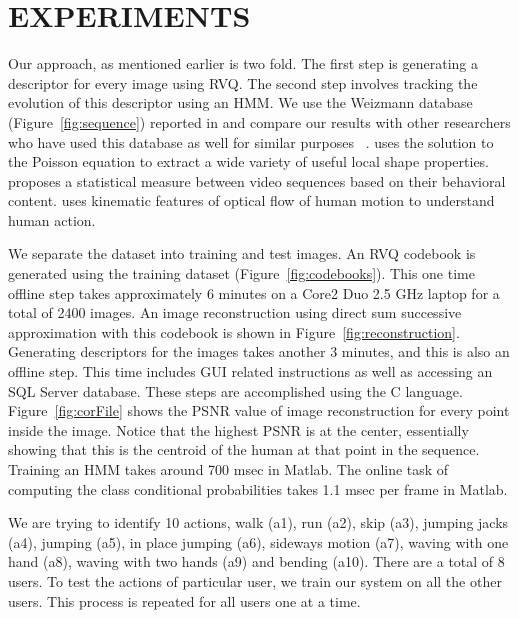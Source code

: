 \documentclass{article}
\begin{document}
\section{EXPERIMENTS}
Our approach, as mentioned earlier is two fold.  The first step is generating a descriptor for every image using RVQ.  The second step involves tracking the evolution of this descriptor using an HMM.  We use the Weizmann database (Figure~\ref{fig:sequence}) reported in \cite{2007_JNL_SpaceTimeShapes_Gorelick} and compare our results with other researchers who have used this database as well for similar purposes~\cite{2007_JNL_SpaceTimeShapes_Gorelick} \cite{2001_CNF_EventBasedAnalysisVideo_Manor} 
\cite{2010_JNL_ActionReconKinematic_Ali}.  \cite{2007_JNL_SpaceTimeShapes_Gorelick} uses the solution to the Poisson equation to extract a wide variety of useful local shape properties.  \cite{2001_CNF_EventBasedAnalysisVideo_Manor} proposes a statistical measure between video sequences based on their behavioral content.  \cite{2010_JNL_ActionReconKinematic_Ali} uses kinematic features of optical flow of human motion to understand human action.   

We separate the dataset into training and test images.  An RVQ codebook is generated using the training dataset (Figure~\ref{fig:codebooks}).  This one time offline step takes approximately 6 minutes on a Core2 Duo 2.5 GHz laptop for a total of 2400 images.  An image reconstruction using direct sum successive approximation with this codebook is shown in Figure~\ref{fig:reconstruction}.  Generating descriptors for the images takes another 3 minutes, and this is also an offline step.  This time includes GUI related instructions as well as accessing an SQL Server database.  These steps are accomplished using the C language.  Figure~\ref{fig:corFile} shows the PSNR value of image reconstruction for every point inside the image.  Notice that the highest PSNR is at the center, essentially showing that this is the centroid of the human at that point in the sequence.  Training an HMM takes around 700 msec in Matlab.  The online task of computing the class conditional probabilities takes 1.1 msec per frame in Matlab.   

We are trying to identify 10 actions, walk (a1), run (a2), skip (a3), jumping jacks (a4), jumping (a5), in place jumping (a6), sideways motion (a7), waving with one hand (a8), waving with two hands (a9) and bending (a10).  There are a total of 8 users.  To test the actions of particular user, we train our system on all the other users.  This process is repeated for all users one at a time.
\end{document}
